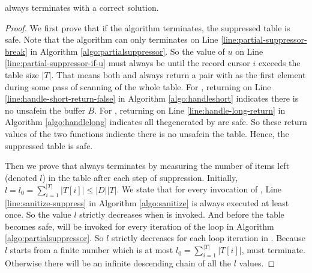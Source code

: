 \begin{theorem}
\label{CorrectnessOfPartialSuppressor}
  \PartialSuppressor always terminates with a correct solution.
\end{theorem}
\begin{proof}
We first prove that if the algorithm terminates, the suppressed table is safe.
Note that the algorithm can only terminates on Line \ref{line:partial-suppressor-break}
  in Algorithm \ref{algo:partialsuppressor}.
So the value of $u$ on Line \ref{line:partial-suppressor-if-u} must always be \FALSE
  until the record cursor $i$ exceeds the table size $|T|$.
That means both \HandleShortRecords and \HandleLongRecord always return
  a pair with \FALSE as the first element during some pass of scanning of the whole table.
For \HandleShortRecords, returning \FALSE on Line \ref{line:handle-short-return-false}
  in Algorithm \ref{algo:handleshort} indicates there is no unsafe\qid in the buffer $B$.
For \HandleLongRecord, returning \FALSE on Line \ref{line:handle-long-return}
  in Algorithm \ref{algo:handlelong} indicates all the\qids generated by \Enum are safe.
So these return values of the two functions indicate there is no unsafe\qid in the table.
Hence, the suppressed table is safe.

Then we prove that \PartialSuppressor always terminates by measuring the
  number of items left (denoted $l$) in the table after each step of suppression.
Initially, $l=l_0=\sum_{i=1}^{|T|} |T[i]|\le |D| |T|$.
We state that for every invocation of \SanitizeBuffer, Line \ref{line:sanitize-suppress}
  in Algorithm \ref{algo:sanitize} is always executed at least once.
So the value $l$ strictly decreases when \SanitizeBuffer is invoked.
And before the table becomes safe, \SanitizeBuffer will be invoked for
  every iteration of the loop in Algorithm \ref{algo:partialsuppressor}.
So $l$ strictly decreases for each loop iteration in \PartialSuppressor.
Because $l$ starts from a finite number which is at most $l_0=\sum_{i=1}^{|T|} |T[i]|$,
  \PartialSuppressor must terminate.
Otherwise there will be an infinite descending chain of all the $l$ values.


\end{proof}
